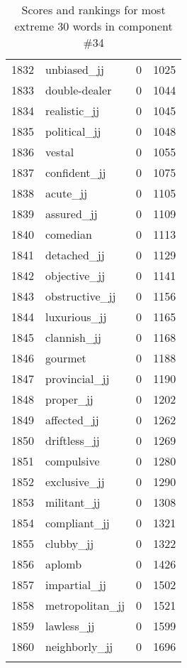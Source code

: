 \begin{longtable}[!htbp]{| rlr@{.}l |}
    1832 & unbiased\_jj & 0 & 1025 \\
    1833 & double-dealer & 0 & 1044 \\
    1834 & realistic\_jj & 0 & 1045 \\
    1835 & political\_jj & 0 & 1048 \\
    1836 & vestal & 0 & 1055 \\
    1837 & confident\_jj & 0 & 1075 \\
    1838 & acute\_jj & 0 & 1105 \\
    1839 & assured\_jj & 0 & 1109 \\
    1840 & comedian & 0 & 1113 \\
    1841 & detached\_jj & 0 & 1129 \\
    1842 & objective\_jj & 0 & 1141 \\
    1843 & obstructive\_jj & 0 & 1156 \\
    1844 & luxurious\_jj & 0 & 1165 \\
    1845 & clannish\_jj & 0 & 1168 \\
    1846 & gourmet & 0 & 1188 \\
    1847 & provincial\_jj & 0 & 1190 \\
    1848 & proper\_jj & 0 & 1202 \\
    1849 & affected\_jj & 0 & 1262 \\
    1850 & driftless\_jj & 0 & 1269 \\
    1851 & compulsive & 0 & 1280 \\
    1852 & exclusive\_jj & 0 & 1290 \\
    1853 & militant\_jj & 0 & 1308 \\
    1854 & compliant\_jj & 0 & 1321 \\
    1855 & clubby\_jj & 0 & 1322 \\
    1856 & aplomb & 0 & 1426 \\
    1857 & impartial\_jj & 0 & 1502 \\
    1858 & metropolitan\_jj & 0 & 1521 \\
    1859 & lawless\_jj & 0 & 1599 \\
    1860 & neighborly\_jj & 0 & 1696 \\
    \hline
    \caption{Scores and rankings for most extreme 30 words in component \#34} \\
\end{longtable}

